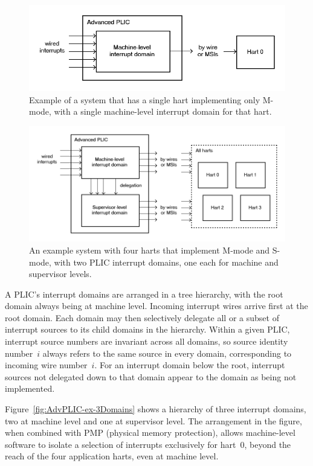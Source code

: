 \begin{figure}[th]
\centerline{\includegraphics[scale=0.55]{AdvPLIC-ex-1Domain.png}}
\caption{%
Example of a {\RISCV} system that has a single hart implementing only
\mbox{M-mode}, with a single machine-level interrupt domain for that
hart.%
}
\label{fig:AdvPLIC-ex-1Domain}
\end{figure}

\begin{figure}[th]
\centerline{\includegraphics[scale=0.55]{AdvPLIC-ex-2Domains.png}}
\caption{%
An example system with four harts that implement \mbox{M-mode} and
\mbox{S-mode}, with two PLIC interrupt domains, one each for machine
and supervisor levels.%
}
\label{fig:AdvPLIC-ex-2Domains}
\end{figure}

A PLIC's interrupt domains are arranged in a tree hierarchy, with the
root domain always being at machine level.
Incoming interrupt wires arrive first at the root domain.
Each domain may then selectively delegate all or a subset of interrupt
sources to its child domains in the hierarchy.
Within a given PLIC, interrupt source numbers are invariant across all
domains, so source identity number~$i$ always refers to the same source
in every domain, corresponding to incoming wire number~$i$.
For an interrupt domain below the root, interrupt sources not delegated
down to that domain appear to the domain as being not implemented.

Figure~\ref{fig:AdvPLIC-ex-3Domains} shows a hierarchy of three
interrupt domains, two at machine level and one at supervisor level.
The arrangement in the figure, when combined with PMP (physical memory
protection), allows machine-level software to isolate a selection
of interrupts exclusively for hart~0, beyond the reach of the four
application harts, even at machine level.

